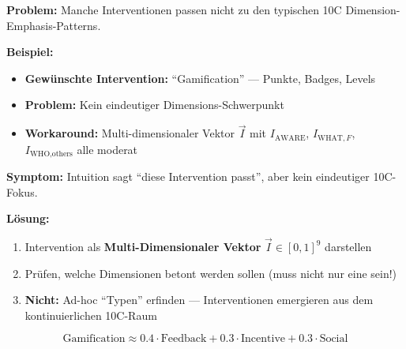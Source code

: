 \begin{tcolorbox}[colback=red!5!white, colframe=red!75!black,
    title=\textbf{Failure Mode 4: Fehlende Dimension-Patterns}]

\textbf{Problem:} Manche Interventionen passen nicht zu den typischen 10C Dimension-Emphasis-Patterns.

\medskip
\textbf{Beispiel:}
\begin{itemize}[nosep]
    \item \textbf{Gewünschte Intervention:} ``Gamification'' --- Punkte, Badges, Levels
    \item \textbf{Problem:} Kein eindeutiger Dimensions-Schwerpunkt
    \item \textbf{Workaround:} Multi-dimensionaler Vektor $\vec{I}$ mit $I_{\text{AWARE}}$, $I_{\text{WHAT},F}$, $I_{\text{WHO},\text{others}}$ alle moderat
\end{itemize}

\medskip
\textbf{Symptom:} Intuition sagt ``diese Intervention passt'', aber kein eindeutiger 10C-Fokus.

\textbf{Lösung:}
\begin{enumerate}[nosep]
    \item Intervention als \textbf{Multi-Dimensionaler Vektor} $\vec{I} \in [0,1]^9$ darstellen
    \item Prüfen, welche Dimensionen betont werden sollen (muss nicht nur eine sein!)
    \item \textbf{Nicht:} Ad-hoc ``Typen'' erfinden --- Interventionen emergieren aus dem kontinuierlichen 10C-Raum
\end{enumerate}

\begin{equation*}
\text{Gamification} \approx 0.4 \cdot \text{Feedback} + 0.3 \cdot \text{Incentive} + 0.3 \cdot \text{Social}
\end{equation*}

\end{tcolorbox}

